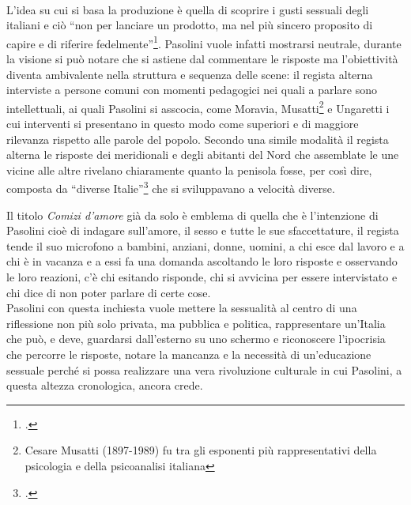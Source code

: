 \paragraph{}L'idea su cui si basa la produzione è quella di scoprire i gusti sessuali degli italiani e ciò \enquote{non per lanciare un prodotto, ma nel più sincero proposito di capire e di riferire fedelmente}\footcite{Comizi}.
Pasolini vuole infatti mostrarsi neutrale, durante la visione si può notare che si astiene dal commentare le risposte ma l'obiettività diventa ambivalente nella struttura e sequenza delle scene: il regista alterna interviste a persone comuni con momenti pedagogici nei quali a parlare sono intellettuali, ai quali Pasolini si asscocia, come Moravia, Musatti\footnote{Cesare Musatti (1897-1989) fu tra gli esponenti più rappresentativi della psicologia e della psicoanalisi italiana} e Ungaretti i cui interventi si presentano in questo modo come superiori e di maggiore rilevanza rispetto alle parole del popolo.
Secondo una simile modalità il regista alterna le risposte dei meridionali e degli abitanti del Nord che assemblate le une vicine alle altre rivelano chiaramente quanto la penisola fosse, per così dire, composta da \enquote{diverse Italie}\footcite{Danti2} che si sviluppavano a velocità diverse.

Il titolo \textit{Comizi d'amore} già da solo è emblema di quella che è l'intenzione di Pasolini cioè di indagare sull'amore, il sesso e tutte le sue sfaccettature, il regista tende il suo microfono a bambini, anziani, donne, uomini, a chi esce dal lavoro e a chi è in vacanza e a essi fa una domanda ascoltando le loro risposte e osservando le loro reazioni, c'è chi esitando risponde, chi si avvicina per essere intervistato e chi dice di non poter parlare di certe cose.
\\Pasolini con questa inchiesta vuole mettere la sessualità al centro di una riflessione non più solo privata, ma pubblica e politica, rappresentare un'Italia che può, e deve, guardarsi dall'esterno su uno schermo e riconoscere l'ipocrisia che percorre le risposte, notare la mancanza e la necessità di un'educazione sessuale perché si possa realizzare una vera rivoluzione culturale in cui Pasolini, a questa altezza cronologica, ancora crede.


